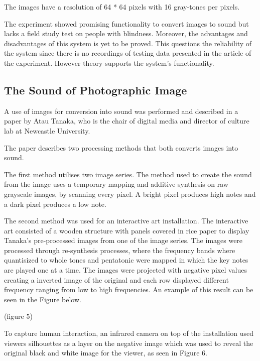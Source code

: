 The images have a resolution of 64 * 64 pixels with 16 gray-tones per pixels.  

The experiment showed promising functionality to convert images to sound but lacks a field study test on people with blindness. Moreover, the advantages and disadvantages of this system is yet to be proved. This questions the reliability of the system since there is no recordings of testing data presented in the article of the experiment. However theory supports the system's functionality.  

\subsection{The Sound of Photographic Image}\label{sec:soundarticle}

A use of images for conversion into sound was performed and described in a paper by Atau Tanaka, who is the chair of digital media and director of culture lab at Newcastle University.

The paper describes two processing methods that both converts images into sound.

The first method utilises two image series. The method used to create the sound from the image uses a temporary mapping and additive synthesis on raw grayscale images, by scanning every pixel. A bright pixel produces high notes and a dark pixel produces a low note. 

The second method was used for an interactive art installation. The interactive art consisted of a wooden structure with panels covered in rice paper to display Tanaka's pre-processed images from one of the image series. The images were processed through re-synthesis processes, where the frequency bands where quantisized to whole tones and pentatonic were mapped in which the key notes are played one at a time. The images were projected with negative pixel values creating a inverted image of the original and each row displayed different frequency ranging from low to high frequencies. An example of this result can be seen in the Figure below.  

(figure 5) 

To capture human interaction, an infrared camera on top of the installation used viewers silhouettes as a layer on the negative image which was used to reveal the original black and white image for the viewer, as seen in Figure 6.

